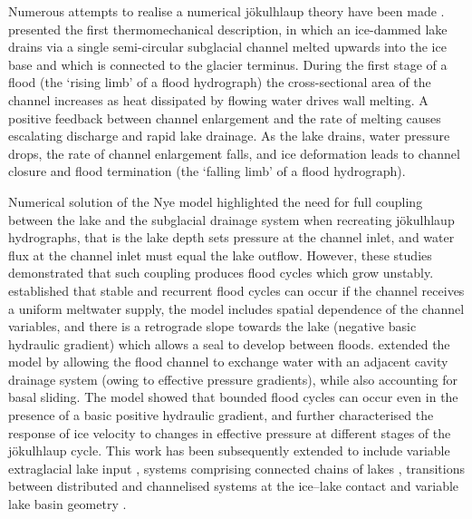 \documentclass[tc, manuscript]{copernicus}
\begin{document}
Numerous attempts to realise a numerical jökulhlaup theory have been made \citep[e.g.,][]{nye1976water,spring1981numerical,clarke1982glacier,ng1998mathematical,fowler1999breaking,ng2003clague,kessler2004testing,ng2007climatic,kingslake2013modelling}. \citet{nye1976water} presented the first thermomechanical description, in which an ice-dammed lake drains via a single semi-circular subglacial channel melted upwards into the ice base and which is connected to the glacier terminus. During the first stage of a flood (the `rising limb' of a flood hydrograph) the cross-sectional area of the channel increases as heat dissipated by flowing water drives wall melting. A positive feedback between channel enlargement and the rate of melting causes escalating discharge and rapid lake drainage. As the lake drains, water pressure drops, the rate of channel enlargement falls, and ice deformation leads to channel closure and flood termination (the `falling limb' of a flood hydrograph).

Numerical solution of the Nye model \citep[e.g.,][]{spring1981numerical,clarke1982glacier,ng1998mathematical,fowler1999breaking} highlighted the need for full coupling between the lake and the subglacial drainage system when recreating jökulhlaup hydrographs, that is the lake depth sets pressure at the channel inlet, and water flux at the channel inlet must equal the lake outflow. However, these studies demonstrated that such coupling produces flood cycles which grow unstably. \citet{fowler1999breaking} established that stable and recurrent flood cycles can occur if the channel receives a uniform meltwater supply, the model includes spatial dependence of the channel variables, and there is a retrograde slope towards the lake (negative basic hydraulic gradient) which allows a seal to develop between floods. \citet{kingslake2013modelling} extended the \citet{fowler1999breaking} model by allowing the flood channel to exchange water with an adjacent cavity drainage system (owing to effective pressure gradients), while also accounting for basal sliding. The \citet{kingslake2013modelling} model showed that bounded flood cycles can occur even in the presence of a basic positive hydraulic gradient, and further characterised the response of ice velocity to changes in effective pressure at different stages of the jökulhlaup cycle. This work has been subsequently extended to include variable extraglacial lake input \citep[e.g., precipitation and snowmelt;][]{kingslake2015chaotic}, systems comprising connected chains of lakes \citep{stubblefield2019modeling}, transitions between distributed and channelised systems at the ice--lake contact \citep{schoof2020analysis} and variable lake basin geometry \citep{jenson2022long}. 
\end{document}
